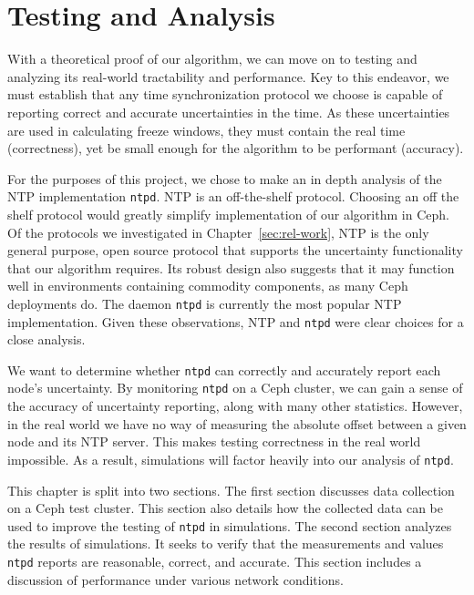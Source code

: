 \chapter{Testing and Analysis}
\label{sec:results}

With a theoretical proof of our algorithm, we can move on to testing
and analyzing its real-world tractability and performance.  Key to
this endeavor, we must establish that any time synchronization
protocol we choose is capable of reporting correct and accurate
uncertainties in the time. As these uncertainties are used in
calculating freeze windows, they must contain the real time
(correctness), yet be small enough for the algorithm to be performant
(accuracy).

For the purposes of this project, we chose to make an in depth
analysis of the NTP implementation \texttt{ntpd}. NTP is an
off-the-shelf protocol. Choosing an off the shelf protocol would
greatly simplify implementation of our algorithm in Ceph. Of the
protocols we investigated in Chapter~\ref{sec:rel-work}, NTP is the
only general purpose, open source protocol that supports the
uncertainty functionality that our algorithm requires. Its robust
design also suggests that it may function well in environments
containing commodity components, as many Ceph deployments do. The
daemon \texttt{ntpd} is currently the most popular NTP
implementation. Given these observations, NTP and \texttt{ntpd} were
clear choices for a close analysis.

We want to determine whether \texttt{ntpd} can correctly and
accurately report each node's uncertainty. By monitoring \texttt{ntpd}
on a Ceph cluster, we can gain a sense of the accuracy of uncertainty
reporting, along with many other statistics. However, in the real
world we have no way of measuring the absolute offset between a given
node and its NTP server. This makes testing correctness in the real
world impossible. As a result, simulations will factor heavily into
our analysis of \texttt{ntpd}.

This chapter is split into two sections. The first section discusses
data collection on a Ceph test cluster. This section also details how
the collected data can be used to improve the testing of \texttt{ntpd}
in simulations.  The second section analyzes the results of
simulations. It seeks to verify that the measurements and values
\texttt{ntpd} reports are reasonable, correct, and accurate. This
section includes a discussion of performance under various network
conditions.

